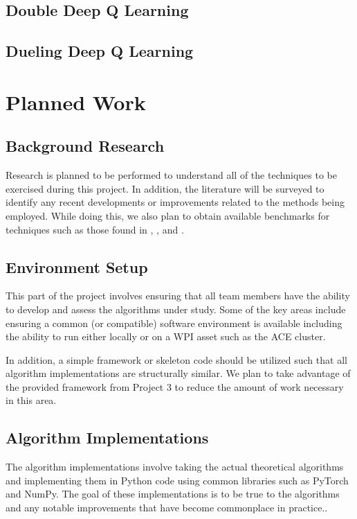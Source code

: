 \documentclass[conference]{IEEEtran}
\begin{document}
\subsection{Double Deep Q Learning}

\subsection{Dueling Deep Q Learning}

\section{Planned Work}

\subsection{Background Research}
Research is planned to be performed to understand all of the techniques to be exercised during this project.
In addition, the literature will be surveyed to identify any recent developments or improvements related to the methods being employed.
While doing this, we also plan to obtain available benchmarks for techniques such as those found in \cite{DQNOriginalPaper}, \cite{NatureDeepLearning}, and \cite{bhonker2017playing}.

\subsection{Environment Setup}
This part of the project involves ensuring that all team members have the ability to develop and assess the algorithms under study.
Some of the key areas include ensuring a common (or compatible) software environment is available including the ability to run \cite{bhonker2017playing} either locally or on a WPI asset such as the ACE cluster.

In addition, a simple framework or skeleton code should be utilized such that all algorithm implementations are structurally similar.
We plan to take advantage of the provided framework from Project 3 to reduce the amount of work necessary in this area.

\subsection{Algorithm Implementations}
The algorithm implementations involve taking the actual theoretical algorithms and implementing them in Python code using common libraries such as PyTorch and NumPy.
The goal of these implementations is to be true to the algorithms and any notable improvements that have become commonplace in practice..
\end{document}
